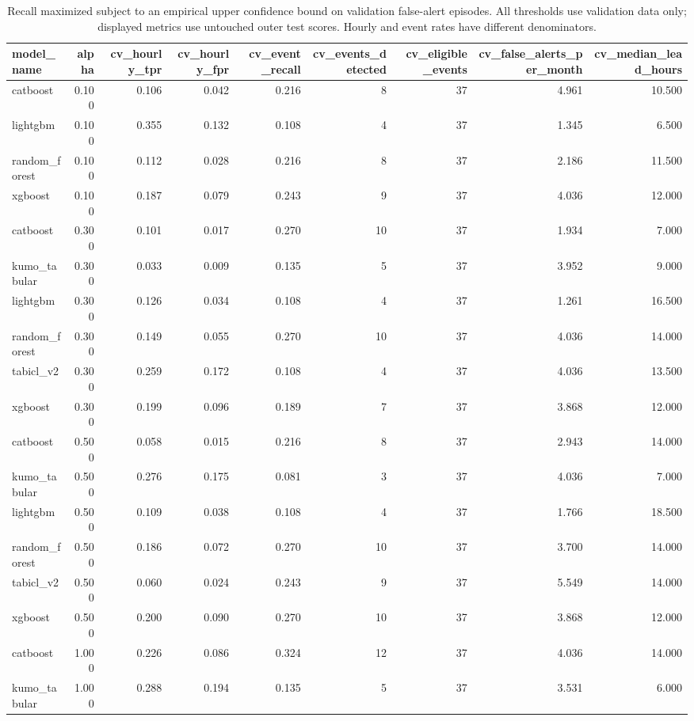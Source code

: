 \begin{table}
\caption{Recall maximized subject to an empirical upper confidence bound on validation false-alert episodes. All thresholds use validation data only; displayed metrics use untouched outer test scores. Hourly and event rates have different denominators.}
\begin{tabular}{lrrrrrrrr}
\toprule
model\_name & alpha & cv\_hourly\_tpr & cv\_hourly\_fpr & cv\_event\_recall & cv\_events\_detected & cv\_eligible\_events & cv\_false\_alerts\_per\_month & cv\_median\_lead\_hours \\
\midrule
catboost & 0.100 & 0.106 & 0.042 & 0.216 & 8 & 37 & 4.961 & 10.500 \\
lightgbm & 0.100 & 0.355 & 0.132 & 0.108 & 4 & 37 & 1.345 & 6.500 \\
random\_forest & 0.100 & 0.112 & 0.028 & 0.216 & 8 & 37 & 2.186 & 11.500 \\
xgboost & 0.100 & 0.187 & 0.079 & 0.243 & 9 & 37 & 4.036 & 12.000 \\
catboost & 0.300 & 0.101 & 0.017 & 0.270 & 10 & 37 & 1.934 & 7.000 \\
kumo\_tabular & 0.300 & 0.033 & 0.009 & 0.135 & 5 & 37 & 3.952 & 9.000 \\
lightgbm & 0.300 & 0.126 & 0.034 & 0.108 & 4 & 37 & 1.261 & 16.500 \\
random\_forest & 0.300 & 0.149 & 0.055 & 0.270 & 10 & 37 & 4.036 & 14.000 \\
tabicl\_v2 & 0.300 & 0.259 & 0.172 & 0.108 & 4 & 37 & 4.036 & 13.500 \\
xgboost & 0.300 & 0.199 & 0.096 & 0.189 & 7 & 37 & 3.868 & 12.000 \\
catboost & 0.500 & 0.058 & 0.015 & 0.216 & 8 & 37 & 2.943 & 14.000 \\
kumo\_tabular & 0.500 & 0.276 & 0.175 & 0.081 & 3 & 37 & 4.036 & 7.000 \\
lightgbm & 0.500 & 0.109 & 0.038 & 0.108 & 4 & 37 & 1.766 & 18.500 \\
random\_forest & 0.500 & 0.186 & 0.072 & 0.270 & 10 & 37 & 3.700 & 14.000 \\
tabicl\_v2 & 0.500 & 0.060 & 0.024 & 0.243 & 9 & 37 & 5.549 & 14.000 \\
xgboost & 0.500 & 0.200 & 0.090 & 0.270 & 10 & 37 & 3.868 & 12.000 \\
catboost & 1.000 & 0.226 & 0.086 & 0.324 & 12 & 37 & 4.036 & 14.000 \\
kumo\_tabular & 1.000 & 0.288 & 0.194 & 0.135 & 5 & 37 & 3.531 & 6.000 \\

\end{tabular}
\end{table}
